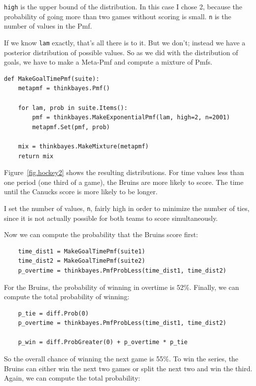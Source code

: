 \documentclass[12pt]{book}
\begin{document}
{\tt high} is the upper bound of the distribution.  In this case
I chose 2, because the probability of going more than two games
without scoring is small.  {\tt n} is the number of values in
the Pmf.

If we know {\tt lam} exactly, that's all there is to it.
But we don't; instead we have a posterior
distribution of possible values.  So as we did with the distribution
of goals, we have to make a Meta-Pmf and compute a mixture of
Pmfs.

\begin{verbatim}
def MakeGoalTimePmf(suite):
    metapmf = thinkbayes.Pmf()

    for lam, prob in suite.Items():
        pmf = thinkbayes.MakeExponentialPmf(lam, high=2, n=2001)
        metapmf.Set(pmf, prob)

    mix = thinkbayes.MakeMixture(metapmf)
    return mix
\end{verbatim}  

Figure~\ref{fig.hockey2} shows the resulting distributions.  For
time values less than one period (one third of a game), the Bruins
are more likely to score.  The time until the Canucks score is
more likely to be longer.

I set the number of values, {\tt n},
fairly high in order to minimize the number of ties, since it is not
actually possible for both teams to score simultaneously.

Now we can compute the probability that the Bruins score first:

\begin{verbatim}
    time_dist1 = MakeGoalTimePmf(suite1)
    time_dist2 = MakeGoalTimePmf(suite2)
    p_overtime = thinkbayes.PmfProbLess(time_dist1, time_dist2)
\end{verbatim}  

For the Bruins, the probability of winning in overtime is 52\%.
Finally, we can compute the total probability of winning:

\begin{verbatim}
    p_tie = diff.Prob(0)
    p_overtime = thinkbayes.PmfProbLess(time_dist1, time_dist2)

    p_win = diff.ProbGreater(0) + p_overtime * p_tie
\end{verbatim}  

So the overall chance of winning the next game is 55\%.
To win the series, the Bruins can either win the next two games
or split the next two and win the third.  Again, we can compute
the total probability:
\end{document}
